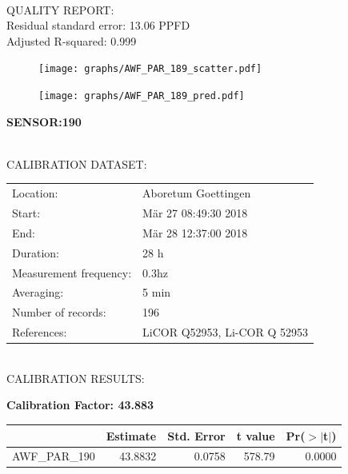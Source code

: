 \documentclass[oneside]{report}
\begin{document}
\hrulefill\\
QUALITY REPORT:\\
Residual standard error: 13.06 PPFD\\
Adjusted R-squared: 0.999



\begin{figure}[H]
  \centering
  \texttt{[image: graphs/AWF\_PAR\_189\_scatter.pdf]}
\end{figure}




\begin{figure}[H]
  \centering
  \texttt{[image: graphs/AWF\_PAR\_189\_pred.pdf]}
\end{figure}

\pagebreak


\begin{center}
\large{\textbf{SENSOR:190}}\\
\end{center}

\hrulefill\\
CALIBRATION DATASET:\\
\begin{table}[h!]
  \centering
  \label{tab:table1}
  \begin{tabular}{ll}
    Location: & Aboretum Goettingen\\ 
    
    
    Start:  & Mär 27 08:49:30 2018 \\
    End:   & Mär 28 12:37:00 2018\\ 
    Duration: & 28 h\\
    Measurement frequency: & 0.3hz\\
    Averaging:  &5 min\\
    Number of records: & 196 \\
    References: & LiCOR Q52953, Li-COR Q 52953 \\
  \end{tabular}
\end{table}

\hrulefill\\
CALIBRATION RESULTS:\\


\begin{center}
\textbf{\large{Calibration Factor: 43.883}}\\
\end{center}
\begin{table}[ht]
\centering
\begin{tabular}{rrrrr}
  \hline
 & Estimate & Std. Error & t value & Pr($>$$|$t$|$) \\ 
  \hline
AWF\_PAR\_190 & 43.8832 & 0.0758 & 578.79 & 0.0000 \\ 
   \hline
\end{tabular}
\end{table}
\end{document}
